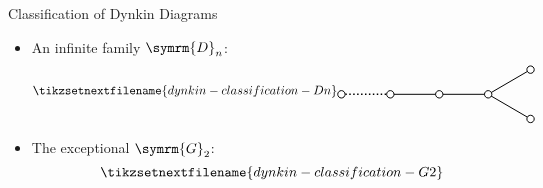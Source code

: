 \documentclass[fleqn]{NotesClass}
\newcommand{\dynkin}[2]{\symrm{#1}_{#2}}
\begin{document}
\begin{thm}{Classification of Dynkin Diagrams}{}
\begin{itemize}
            \begin{equation*}
                \tikzsetnextfilename{dynkin-classification-Cn}
                \begin{tikzpicture}[baseline=(current bounding box), scale=0.7]
                    \draw[dotted, very thick] (0, 0) -- (2, 0);
                    \draw[thick] (2, 0) -- (8, 0);
                    \draw[thick, yshift=0.05cm] (8, 0) -- (10, 0);
                    \draw[thick, yshift=-0.05cm] (8, 0) -- (10, 0);
                    \draw[thick, fill=white] (0, 0) circle [radius=0.15];
                    \draw[thick, fill=white] (2, 0) circle [radius=0.15];
                    \draw[thick, fill=white] (4, 0) circle [radius=0.15];
                    \draw[thick, fill=white] (6, 0) circle [radius=0.15];
                    \draw[thick, fill=white] (8, 0) circle [radius=0.15];
                    \draw[thick, fill=white] (10, 0) circle [radius=0.15];
                    \draw[thick] (9.2, 0.2) -- (8.8, 0) -- (9.2, -0.2);
                \end{tikzpicture}
            \end{equation*}
            \item An infinite family \(\dynkin{D}{n}\):
            \begin{equation*}
                \tikzsetnextfilename{dynkin-classification-Dn}
                \begin{tikzpicture}[baseline=(current bounding box), scale=0.7]
                    \draw[dotted, very thick] (0, 0) -- (2, 0);
                    \draw[thick] (2, 0) -- (6, 0);
                    \draw[thick] (6, 0) -- ++ (30:2);
                    \draw[thick] (6, 0) -- ++ (-30:2);
                    \draw[thick, fill=white] (0, 0) circle [radius=0.15];
                    \draw[thick, fill=white] (2, 0) circle [radius=0.15];
                    \draw[thick, fill=white] (4, 0) circle [radius=0.15];
                    \draw[thick, fill=white] (6, 0) circle [radius=0.15];
                    \draw[thick, fill=white, xshift=6cm] (30:2) circle [radius=0.15];
                    \draw[thick, fill=white, xshift=6cm] (-30:2) circle [radius=0.15];
                \end{tikzpicture}
            \end{equation*}
            \item The exceptional \(\dynkin{G}{2}\):
            \begin{equation*}
                \tikzsetnextfilename{dynkin-classification-G2}
                \begin{tikzpicture}[baseline=(current bounding box), scale=0.7]

\end{tikzpicture}
\end{equation*}
\end{itemize}
\end{thm}
\end{document}
